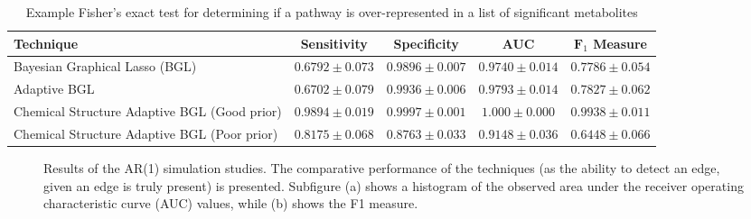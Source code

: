 \begin{table}[h!]
	\caption[Exact test]{Example Fisher's exact test for determining if a pathway is over-represented in a list of significant metabolites \label{tab:pathExact} }
	\begin{center}
		\begin{tabular}{| p{4cm}|c c c c |}
			\hline
			\textbf{Technique} &	\textbf{Sensitivity}	& \textbf{Specificity} &	\textbf{AUC} &	$\textbf{F}_1$ \textbf{Measure} \\
			\hline  \hline
			Bayesian Graphical Lasso (BGL)	& $0.6792 \pm 0.073$ & $0.9896 \pm 0.007$	& $0.9740 \pm 0.014$	& $0.7786 \pm 0.054$ \\
			\hline
			Adaptive BGL &	$0.6702  \pm 0.079$	& $0.9936  \pm 0.006$ &	$0.9793  \pm 0.014$ &	$0.7827  \pm 0.062$\\
			\hline
Chemical Structure Adaptive BGL (Good prior) &	$0.9894 \pm 0.019$ &	$0.9997 \pm 0.001$ &	$1.000 \pm 0.000$ &	$0.9938 \pm 0.011$ \\
\hline
Chemical Structure Adaptive BGL (Poor prior)	&$0.8175 \pm 0.068$	& $0.8763 \pm 0.033$ &	$0.9148 \pm 0.036$ & 	$0.6448 \pm 0.066$ \\
			\hline
		\end{tabular}
	\end{center}
\end{table}

\begin{figure}[h!]
	\caption[AR(1) Results]{Results of the AR(1) simulation studies. The comparative performance of the techniques (as the ability to detect an edge, given an edge is truly present) is presented. Subfigure (a) shows a histogram of the observed area under the receiver operating characteristic curve (AUC) values, while (b) shows the F1 measure.  \label{fig:ar1res} }
\end{figure}